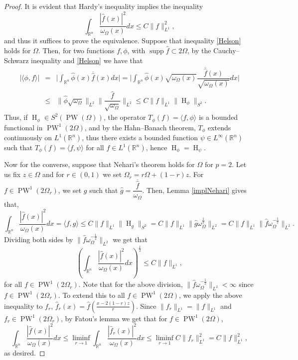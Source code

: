 \documentclass[footinclude=true]{amsart}
\theoremstyle{plain}
\DeclareMathOperator{\Ha}{H}
\DeclareMathOperator{\PW}{PW}
\DeclareMathOperator{\supp}{supp}
\begin{document}
	\begin{proof}
		It is evident that Hardy's inequality implies the inequality \begin{equation}\label{Helson} \int_{\mathbb{R}^{n}}\dfrac{|\widehat{f}(x)|^2}{\omega_{\Omega}(x)}dx\leq C\|f\|_{L^{1}}^2,
			\end{equation} and thus it suffices to prove the equivalence.
		Suppose that inequality \eqref{Helson} holds for $\Omega$. Then, for two functions $f,\phi$, with $\supp\widehat{f}\subset 2\Omega$, by the Cauchy--Schwarz inequality and \eqref{Helson} we have that \begin{eqnarray}
			|\langle \phi,f\rangle|&=&\big|\int_{\mathbb{R}^{n}}\widehat{\phi}(x)\overline{\widehat{f}}(x)dx\big|=\big|\int_{\mathbb{R}^{n}}\widehat{\phi}(x)\sqrt{\omega_{\Omega}(x)}\dfrac{\overline{\widehat{f}}(x)}{\sqrt{\omega_{\Omega}(x)}}dx\big| \nonumber \\
			&\leq&\|\widehat{\phi}\sqrt{\omega_{\Omega}}\|_{L^2} \|\dfrac{\widehat{f}}{\sqrt{\omega_{\Omega}}}\|_{L^2} \leq C\|f\|_{L^{1}}\|\Ha_{\phi}\|_{S^{2}}. \nonumber
		\end{eqnarray}
		Thus, if $\Ha_\phi \in S^2(\PW(\Omega))$, the operator $T_\phi(f)=\langle f,\phi\rangle$ is a bounded functional in $\PW^{1}(2\Omega)$, and by the Hahn--Banach theorem, $T_\phi$ extends continuously on $L^{1}(\mathbb{R}^{n})$, thus there exists a bounded function $\psi\in L^{\infty}(\mathbb{R}^{n})$ such that $T_\phi(f)=\langle f,\psi\rangle$ for all $f\in L^{1}(\mathbb{R}^n)$, hence $\Ha_\phi=\Ha_\psi$. 
		\par Now for the converse, suppose that Nehari's theorem holds for $\Omega$ for $p=2$. Let us fix $z\in \Omega$ and for $r\in (0,1)$ we set $\Omega_r=r\Omega+(1-r)z$. For $f\in \PW^1(2\Omega_r)$, we set $g$ such that $\widehat{g}=\dfrac{\overline{\widehat{f}}}{\omega_{\Omega}}$. Then, Lemma \ref{implNehari} gives that,
		$$\int_{\mathbb{R}^n}\dfrac{|\widehat{f}(x)|^2}{\omega_{\Omega}(x)}dx=\langle f, g \rangle \leq C\|f\|_{L^{1}} \|\Ha_g\|_{S^{2}}= C\|f\|_{L^{1}} \|\widehat{g}\omega_{\Omega}^{\frac{1}{2}}\|_{L^{2}}=C\|f\|_{L^{1}} \|\widehat{f}\omega_{\Omega}^{-\frac{1}{2}}\|_{L^{2}}.$$
		Dividing both sides by $\|\widehat{f}\omega_{\Omega}^{-\frac{1}{2}}\|_{L^{2}}$ we get that
		$$ \left(\int_{\mathbb{R}^n}\dfrac{|\widehat{f}(x)|^2}{\omega_{\Omega}(x)}dx\right)^{\frac{1}{2}} \leq C\|f\|_{L^{1}},$$ for all $f\in \PW^1(2\Omega_r)$. Note that for the above division, $\|\widehat{f}\omega_{\Omega}^{-\frac{1}{2}}\|_{L^{2}}<\infty$ since $f\in \PW^1(2\Omega_r)$. 
		 To extend this to all $f\in \PW^1(2\Omega)$, we apply the above inequality to $f_r$, $\widehat{f}_r(x)=\widehat{f}(\frac{x-2(1-r)z}{r})$. Since $\|f_r\|_{L^1}=\|f\|_{L^1}$ and $f_r\in\PW^1(2\Omega_r)$, by Fatou's lemma we get that for $f\in\PW^1(2\Omega)$,
		$$ \int_{\mathbb{R}^n}\dfrac{|\widehat{f}(x)|^2}{\omega_{\Omega}(x)}dx\leq \liminf_{r\to 1}\int_{\mathbb{R}^n}\dfrac{|\widehat{f}_r(x)|^2}{\omega_{\Omega}(x)}dx\leq \liminf_{r\to 1}C\|f_r\|^2_{L^1}=C\|f\|^2_{L^1},$$
		as desired.
	\end{proof}
\end{document}
